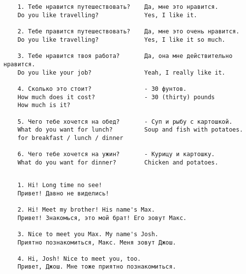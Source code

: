 \subsection*{}
\begin{verbatim}
    1. Тебе нравится путешествовать?    Да, мне это нравится.
    Do you like travelling?             Yes, I like it.

    2. Тебе правится путешествовать?    Да, мне это очень нравится.
    Do you like travelling?             Yes, I like it so much.

    3. Тебе нравится твоя работа?       Да, она мне действительно нравится.
    Do you like your job?               Yeah, I really like it.

    4. Сколько это стоит?               - 30 фунтов.
    How much does it cost?              - 30 (thirty) pounds
    How much is it?

    5. Чего тебе хочется на обед?       - Суп и рыбу с картошкой.
    What do you want for lunch?         Soup and fish with potatoes.
    for breakfast / lunch / dinner

    6. Чего тебе хочется на ужин?       - Курицу и картошку.
    What do you want for dinner?        Chicken and potatoes.
\end{verbatim}

\subsection*{}
\begin{verbatim}
    1. Hi! Long time no see!
    Привет! Давно не виделись!

    2. Hi! Meet my brother! His name's Max.
    Привет! Знакомься, это мой брат! Его зовут Макс.

    3. Nice to meet you Max. My name's Josh.
    Приятно познакомиться, Макс. Меня зовут Джош.

    4. Hi, Josh! Nice to meet you, too.
    Привет, Джош. Мне тоже приятно познакомиться.
\end{verbatim}